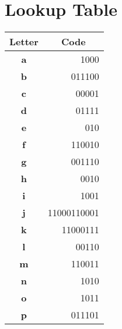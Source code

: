 \documentclass{article}
\begin{document}
    \section{Lookup Table}
    \begin{table}[h]
        \centering
        \begin{tabular}{|c|r|}
            \hline
            \textbf{Letter}                         & \multicolumn{1}{c|}{\textbf{Code}} \\ \hline
            \textbf{a}                              & 1000                               \\ \hline
            \textbf{b}                              & 011100                             \\ \hline
            \textbf{c}                              & 00001                              \\ \hline
            \textbf{d}                              & 01111                              \\ \hline
            \textbf{e}                              & 010                                \\ \hline
            \textbf{f}                              & 110010                             \\ \hline
            \textbf{g}                              & 001110                             \\ \hline
            \textbf{h}                              & 0010                               \\ \hline
            \textbf{i}                              & 1001                               \\ \hline
            \textbf{j}                              & 11000110001                        \\ \hline
            \textbf{k}                              & 11000111                           \\ \hline
            \textbf{l}                              & 00110                              \\ \hline
            \textbf{m}                              & 110011                             \\ \hline
            \textbf{n}                              & 1010                               \\ \hline
            \textbf{o}                              & 1011                               \\ \hline
            \textbf{p}                              & 011101                             \\ \hline

\end{tabular}
\end{table}
\end{document}
